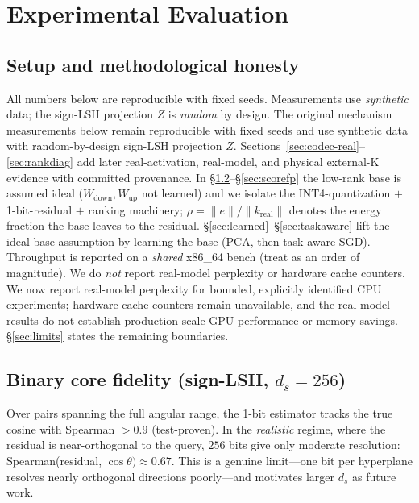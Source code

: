 \documentclass[11pt]{article}
\newcommand{\added}[1]{\textcolor{revisionblue}{#1}}
\newcommand{\deleted}[1]{\textcolor{revisionred}{#1}}
\theoremstyle{plain}
\theoremstyle{definition}
\newcommand{\ds}{d_s}
\begin{document}
\section{Experimental Evaluation}
\label{sec:eval}

\subsection{Setup and methodological honesty}
\label{sec:setup}
\deleted{All numbers below are reproducible with fixed seeds. Measurements use
\emph{synthetic} data; the sign-LSH projection $Z$ is \emph{random} by
design.}
\added{The original mechanism measurements below remain reproducible with fixed
seeds and use synthetic data with random-by-design sign-LSH projection $Z$.
Sections~\ref{sec:codec-real}--\ref{sec:rankdiag} add later real-activation,
real-model, and physical external-K evidence with committed provenance.} In \S\ref{sec:bincore}--\S\ref{sec:scorefp} the low-rank base is
assumed ideal ($W_{\text{down}}, W_{\text{up}}$ not learned) and we
isolate the INT4-quantization $+$ 1-bit-residual $+$ ranking machinery;
$\rho = \lVert e\rVert / \lVert k_{\text{real}}\rVert$ denotes the energy
fraction the base leaves to the residual.
\S\ref{sec:learned}--\S\ref{sec:taskaware} lift the ideal-base
assumption by learning the base (PCA, then task-aware SGD).
Throughput is reported on a \emph{shared} x86\_64 bench (treat as an
order of magnitude). \deleted{We do \emph{not} report real-model perplexity or
hardware cache counters.}
\added{We now report real-model perplexity for bounded, explicitly identified
CPU experiments; hardware cache counters remain unavailable, and the real-model
results do not establish production-scale GPU performance or memory savings.}
\S\ref{sec:limits} states the remaining boundaries.

\subsection{Binary core fidelity (sign-LSH, $\ds=256$)}
\label{sec:bincore}
Over pairs spanning the full angular range, the 1-bit estimator tracks
the true cosine with Spearman $> 0.9$ (test-proven). In the
\emph{realistic} regime, where the residual is near-orthogonal to the
query, $256$ bits give only moderate resolution: Spearman(residual,
$\cos\theta) \approx 0.67$. This is a genuine limit---one bit per
hyperplane resolves nearly orthogonal directions poorly---and motivates
larger $\ds$ as future work.
\end{document}
